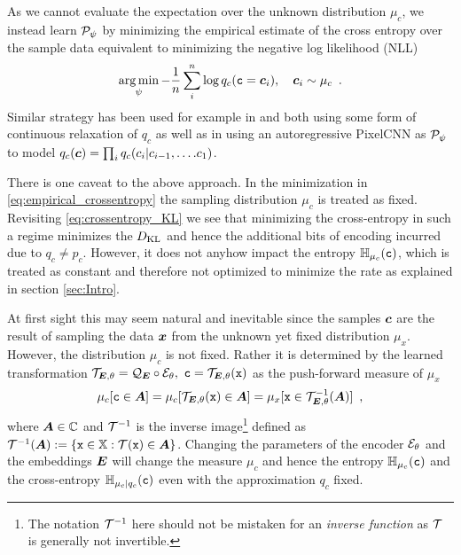 \documentclass{article} %
\renewcommand{\rvx}{\mathtt{x}}
\renewcommand{\rvc}{\mathtt{c}}
\newcommand{\pc}{p_c}
\newcommand{\qc}{q_c}
\newcommand{\muc}{\mu_c}
\newcommand{\Hc}{\sH_{\muc}}
\newcommand{\cHc}{\sH_{\muc|\qc}}
\newcommand{\gEt}{\gE_\theta}
\newcommand{\gQE}{\gQ_\mE}
\newcommand{\gTEt}{\gT_{\mE, \theta}}
\newcommand{\gPp}{\gP_{\psi}}
\begin{document}
As we cannot evaluate the expectation over the unknown distribution $\muc$, we instead learn $\gPp$ by minimizing the empirical estimate of the cross entropy over the sample data equivalent to minimizing the negative log likelihood (NLL)
\begin{align}\label{eq:empirical_crossentropy}
\argmin_\psi - \frac{1}{n}\sum_i^n \log \qc(\rvc = \vc_i), \quad \vc_i \sim \muc \enspace .
\end{align}
Similar strategy has been used for example in \citet{theisLossyImageCompression2017} and \citet{balleEndtoendOptimizedImage2017} both using some form of continuous relaxation of $\qc$ as well as in \citet{mentzerConditionalProbabilityModels2018} using an autoregressive PixelCNN as $\gPp$ to model $\qc(\vc) = \prod_i \qc(\evc_i | \evc_{i-1}, \ldots. \evc_1)$.

There is one caveat to the above approach.
In the minimization in \eqref{eq:empirical_crossentropy} the sampling  distribution $\mu_c$ is treated as fixed.
Revisiting \eqref{eq:crossentropy_KL} we see that minimizing the cross-entropy in such a regime minimizes the $D_{\mathrm{KL}}$ and hence the additional bits of encoding incurred due to $\qc \neq \pc$.
However, it does not anyhow impact the entropy $\Hc(\rvc)$, which is treated as constant and therefore not optimized to minimize the rate as explained in section \ref{sec:Intro}.

At first sight this may seem natural and inevitable since the samples ${\bm{c}}$ are the result of sampling the data ${\bm{x}}$ from the unknown yet fixed distribution $\mu_x$.
However, the distribution $\mu_c$ is not fixed.
Rather it is determined by the learned transformation $\gTEt = \gQE \circ \gEt, \ \rvc = \gTEt(\rvx)$ as the push-forward measure of $\mu_x$
\begin{align}
\mu_c[\rvc \in \mA] = \mu_c[\gTEt(\rvx) \in \mA] = \mu_x[\rvx \in \gTEt^{-1}(\mA)] \enspace ,
\end{align}
where ${\bm{A}} \in {\mathbb{C}}$ and ${\mathcal{T}}^{-1}$ is the inverse image\footnote{The notation ${\mathcal{T}}^{-1}$ here should not be mistaken for an \emph{inverse function} as ${\mathcal{T}}$ is generally not invertible.} defined as $\gT^{-1}(\mA) := \{\rvx \in \sX : \gT(\rvx) \in \mA\}$.
Changing the parameters of the encoder $\gEt$ and the embeddings ${\bm{E}}$ will change the measure $\mu_c$ and hence the entropy $\Hc(\rvc)$ and the cross-entropy $\cHc(\rvc)$ even with the approximation $\qc$ fixed.
\end{document}
